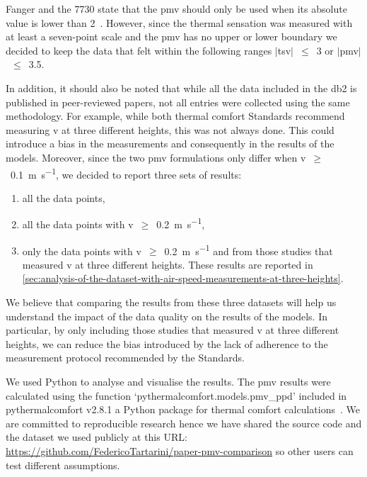 Fanger and the \gls{7730} state that the \ac{pmv} should only be used when its absolute value is lower than 2~\cite{Fanger1970, iso7730}.
However, since the thermal sensation was measured with at least a seven-point scale and the \ac{pmv} has no upper or lower boundary we decided to keep the data that felt within the following ranges $|$\ac{tsv}$|$~$\leq$~\num{3} or $|$\ac{pmv}$|$~$\leq$~\num{3.5}.

In addition, it should also be noted that while all the data included in the \ac{db2} is published in peer-reviewed papers, not all entries were collected using the same methodology.
For example, while both thermal comfort Standards recommend measuring \ac{v} at three different heights, this was not always done.
This could introduce a bias in the measurements and consequently in the results of the models.
Moreover, since the two \ac{pmv} formulations only differ when \ac{v}~$\geq$~\qty{0.1}{\m\per\s}, we decided to report three sets of results:
\begin{enumerate}
    \item all the data points,
    \item all the data points with \ac{v}~$\geq$~\qty{0.2}{\m\per\s},
    \item only the data points with \ac{v}~$\geq$~\qty{0.2}{\m\per\s} and from those studies that measured \ac{v} at three different heights.
    These results are reported in \ref{sec:analysis-of-the-dataset-with-air-speed-measurements-at-three-heights}.
\end{enumerate}
We believe that comparing the results from these three datasets will help us understand the impact of the data quality on the results of the models.
In particular, by only including those studies that measured \ac{v} at three different heights, we can reduce the bias introduced by the lack of adherence to the measurement protocol recommended by the Standards.

We used Python to analyse and visualise the results.
The \ac{pmv} results were calculated using the function `pythermalcomfort.models.pmv\_ppd' included in pythermalcomfort v2.8.1 a Python package for thermal comfort calculations~\cite{Tartarini2020a}.
We are committed to reproducible research hence we have shared the source code and the dataset we used publicly at this URL: \url{https://github.com/FedericoTartarini/paper-pmv-comparison} so other users can test different assumptions.


